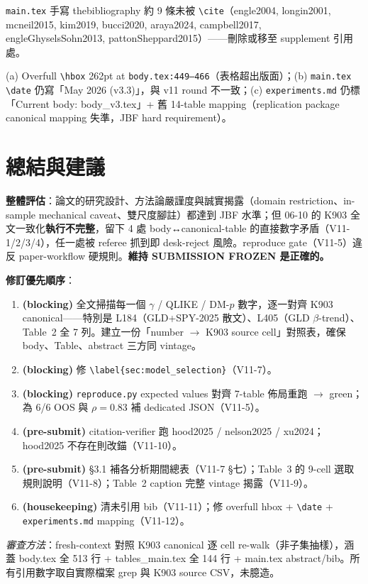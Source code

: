 \documentclass[11pt,a4paper]{article}
\newcommand{\low}{\textbf{LOW}}
\begin{document}
\begin{description}[leftmargin=1.4em]
\item[\low\ V11-11] \texttt{main.tex} 手寫 thebibliography 約 9 條未被 \texttt{\textbackslash cite}（engle2004, longin2001, mcneil2015, kim2019, bucci2020, araya2024, campbell2017, engleGhyselsSohn2013, pattonSheppard2015）——刪除或移至 supplement 引用處。
\item[\low\ V11-12] (a) Overfull \texttt{\textbackslash hbox} 262pt at \texttt{body.tex:449--466}（表格超出版面）；(b) \texttt{main.tex} \texttt{\textbackslash date} 仍寫「May 2026 (v3.3)」，與 v11 round 不一致；(c) \texttt{experiments.md} 仍標「Current body: body\_v3.tex」+ 舊 14-table mapping（replication package canonical mapping 失準，JBF hard requirement）。
\end{description}

\section{總結與建議}

\textbf{整體評估}：論文的研究設計、方法論嚴謹度與誠實揭露（domain restriction、in-sample mechanical caveat、雙尺度腳註）都達到 JBF 水準；但 06-10 的 K903 全文一致化\textbf{執行不完整}，留下 4 處 body↔canonical-table 的直接數字矛盾（V11-1/2/3/4），任一處被 referee 抓到即 desk-reject 風險。reproduce gate（V11-5）違反 paper-workflow 硬規則。\textbf{維持 SUBMISSION FROZEN 是正確的。}

\textbf{修訂優先順序}：
\begin{enumerate}
\item \textbf{(blocking)} 全文掃描每一個 $\gamma$ / QLIKE / DM-$p$ 數字，逐一對齊 K903 canonical——特別是 L184（GLD+SPY-2025 散文）、L405（GLD $\beta$-trend）、Table~2 全 7 列。建立一份「number $\to$ K903 source cell」對照表，確保 body、Table、abstract 三方同 vintage。
\item \textbf{(blocking)} 修 \texttt{\textbackslash label\{sec:model\_selection\}}（V11-7）。
\item \textbf{(blocking)} \texttt{reproduce.py} expected values 對齊 7-table 佈局重跑 $\to$ green；為 6/6 OOS 與 $\rho=0.83$ 補 dedicated JSON（V11-5）。
\item \textbf{(pre-submit)} citation-verifier 跑 hood2025 / nelson2025 / xu2024；hood2025 不存在則改錨（V11-10）。
\item \textbf{(pre-submit)} §3.1 補各分析期間總表（V11-7 §七）；Table~3 的 9-cell 選取規則說明（V11-8）；Table~2 caption 完整 vintage 揭露（V11-9）。
\item \textbf{(housekeeping)} 清未引用 bib（V11-11）；修 overfull hbox + \texttt{\textbackslash date} + \texttt{experiments.md} mapping（V11-12）。
\end{enumerate}

\medskip
\noindent\textit{審查方法}：fresh-context 對照 K903 canonical 逐 cell re-walk（非子集抽樣），涵蓋 body.tex 全 513 行 + tables\_main.tex 全 144 行 + main.tex abstract/bib。所有引用數字取自實際檔案 grep 與 K903 source CSV，未臆造。
\end{document}
